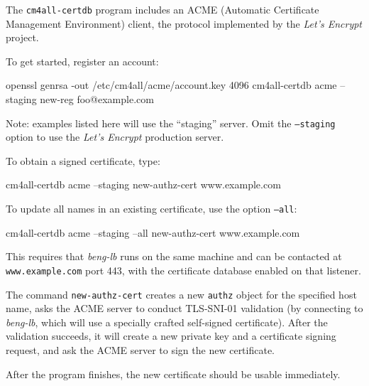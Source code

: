 \documentclass[a4paper,12pt]{article}
\begin{document}
The \texttt{cm4all-certdb} program includes an ACME (Automatic
Certificate Management Environment) client, the protocol implemented
by the \emph{Let's Encrypt} project.

To get started, register an account:

\begin{verbatim*}
openssl genrsa -out /etc/cm4all/acme/account.key  4096
cm4all-certdb acme --staging new-reg foo@example.com
\end{verbatim*}

\small{Note: examples listed here will use the ``staging'' server.
  Omit the \texttt{--staging} option to use the \emph{Let's Encrypt}
  production server.}

To obtain a signed certificate, type:

\begin{verbatim*}
cm4all-certdb acme --staging new-authz-cert www.example.com
\end{verbatim*}

To update all names in an existing certificate, use the option
\texttt{--all}:

\begin{verbatim*}
cm4all-certdb acme --staging --all new-authz-cert www.example.com
\end{verbatim*}

This requires that \emph{beng-lb} runs on the same machine and can be
contacted at \texttt{www.example.com} port 443, with the certificate
database enabled on that listener.

The command \texttt{new-authz-cert} creates a new \texttt{authz}
object for the specified host name, asks the ACME server to conduct
TLS-SNI-01 validation (by connecting to \emph{beng-lb}, which will use
a specially crafted self-signed certificate).  After the validation
succeeds, it will create a new private key and a certificate signing
request, and ask the ACME server to sign the new certificate.

After the program finishes, the new certificate should be usable
immediately.
\end{document}
